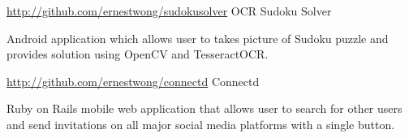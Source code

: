 

\begin{cventries}


  \cventry
    {\href{http://github.com/ernestwong/sudokusolver}{http://github.com/ernestwong/sudokusolver}} %
    { OCR Sudoku Solver} %
    {} %
    {} %
    {
      \begin{cvitems} %
      \item {Android application which allows user to takes picture of Sudoku puzzle and provides solution using OpenCV and TesseractOCR.}
      \end{cvitems}
    }

  \cventry
    {\href{http://github.com/ernestwong/connectd}{http://github.com/ernestwong/connectd}} %
    { Connectd } %
    {} %
    {} %
    {
      \begin{cvitems} %
      \item {Ruby on Rails mobile web application that allows user to search for other users and send invitations on all major social media platforms with a single button.}
      \end{cvitems}
    }


\end{cventries}

